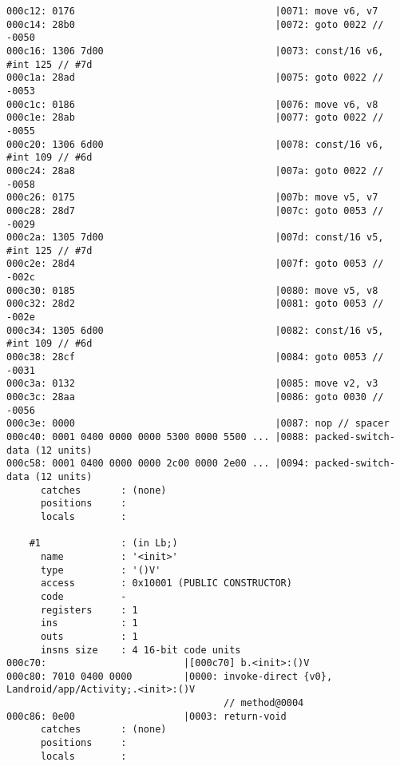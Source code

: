 \begin{lstlisting}
000c12: 0176                                   |0071: move v6, v7
000c14: 28b0                                   |0072: goto 0022 // -0050
000c16: 1306 7d00                              |0073: const/16 v6, #int 125 // #7d
000c1a: 28ad                                   |0075: goto 0022 // -0053
000c1c: 0186                                   |0076: move v6, v8
000c1e: 28ab                                   |0077: goto 0022 // -0055
000c20: 1306 6d00                              |0078: const/16 v6, #int 109 // #6d
000c24: 28a8                                   |007a: goto 0022 // -0058
000c26: 0175                                   |007b: move v5, v7
000c28: 28d7                                   |007c: goto 0053 // -0029
000c2a: 1305 7d00                              |007d: const/16 v5, #int 125 // #7d
000c2e: 28d4                                   |007f: goto 0053 // -002c
000c30: 0185                                   |0080: move v5, v8
000c32: 28d2                                   |0081: goto 0053 // -002e
000c34: 1305 6d00                              |0082: const/16 v5, #int 109 // #6d
000c38: 28cf                                   |0084: goto 0053 // -0031
000c3a: 0132                                   |0085: move v2, v3
000c3c: 28aa                                   |0086: goto 0030 // -0056
000c3e: 0000                                   |0087: nop // spacer
000c40: 0001 0400 0000 0000 5300 0000 5500 ... |0088: packed-switch-data (12 units)
000c58: 0001 0400 0000 0000 2c00 0000 2e00 ... |0094: packed-switch-data (12 units)
      catches       : (none)
      positions     :
      locals        :

    #1              : (in Lb;)
      name          : '<init>'
      type          : '()V'
      access        : 0x10001 (PUBLIC CONSTRUCTOR)
      code          -
      registers     : 1
      ins           : 1
      outs          : 1
      insns size    : 4 16-bit code units
000c70:                        |[000c70] b.<init>:()V
000c80: 7010 0400 0000         |0000: invoke-direct {v0}, Landroid/app/Activity;.<init>:()V
                                      // method@0004
000c86: 0e00                   |0003: return-void
      catches       : (none)
      positions     :
      locals        :


\end{lstlisting}
